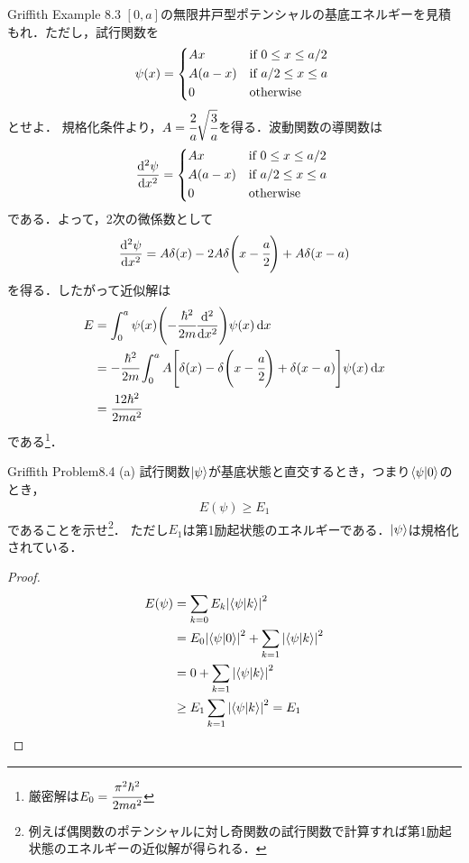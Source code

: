 \documentclass{report}
\begin{document}
  \begin{myexc}{Griffith Example 8.3}{}
    $[0, a]$の無限井戸型ポテンシャルの基底エネルギーを見積もれ．ただし，試行関数を
    \begin{align}
      \psi(x)=
      \begin{dcases*}
        Ax & if $0 \leq x \leq a/2$ \\
        A(a - x) & if $a/2\leq x \leq a$ \\ 
        0 & otherwise 
      \end{dcases*}
    \end{align}
    とせよ．
    \tcblower
    規格化条件より，$A = \cfrac{2}{a}\sqrt{\cfrac{3}{a}}$を得る．波動関数の導関数は
    \begin{align}
      \dv[2]{\psi}{x} =
        \begin{dcases*}
          Ax & if $0 \leq x \leq a/2$ \\
          A(a - x) & if $a/2\leq x \leq a$ \\ 
          0 & otherwise 
        \end{dcases*}
    \end{align}
    である．よって，2次の微係数として
    \begin{align}
      \dv[2]{\psi}{x} = A\delta(x) - 2A\delta\qty(x - \cfrac{a}{2}) + A\delta(x - a)
    \end{align}
    を得る．したがって近似解は
    \begin{align}
      E &= \int_{0}^{a}\psi(x)\qty(-\cfrac{\hbar^2}{2m}\dv[2]{x})\psi(x)\dd{x}\\
      &= -\cfrac{\hbar^2}{2m}\int_{0}^{a} A\qty[\delta(x)-\delta\qty(x-\cfrac{a}{2}) + \delta(x - a)]\psi(x)\dd{x}\\
      &= \cfrac{12\hbar^2}{2ma^2}
    \end{align}
    である\footnote{
      厳密解は$E_0 = \cfrac{\pi^2\hbar^2}{2ma^2}$
    }．
  \end{myexc}
  \begin{myexc}{Griffith Problem8.4 (a)}{}
    試行関数$\ket{\psi}$が基底状態と直交するとき，つまり$\braket{\psi}{0}$のとき，
    \begin{align}
      E(\psi)\geq E_1
    \end{align}
    であることを示せ\footnote{
      例えば偶関数のポテンシャルに対し奇関数の試行関数で計算すれば第1励起状態のエネルギーの近似解が得られる．
    }．
    ただし$E_1$は第1励起状態のエネルギーである．$\ket{\psi}$は規格化されている．
    \tcblower
    \begin{proof}
      \begin{align}
        E(\psi) &= \sum_{k = 0}E_k\abs{\braket{\psi}{k}}^2 \\
        &= E_0\abs{\braket{\psi}{0}}^2 + \sum_{k = 1}\abs{\braket{\psi}{k}}^2 \\
        &= 0 + \sum_{k = 1}\abs{\braket{\psi}{k}}^2 \\
        &\geq E_1\sum_{k = 1}\abs{\braket{\psi}{k}}^2 = E_1
      \end{align}
    \end{proof}
  \end{myexc}
\end{document}
